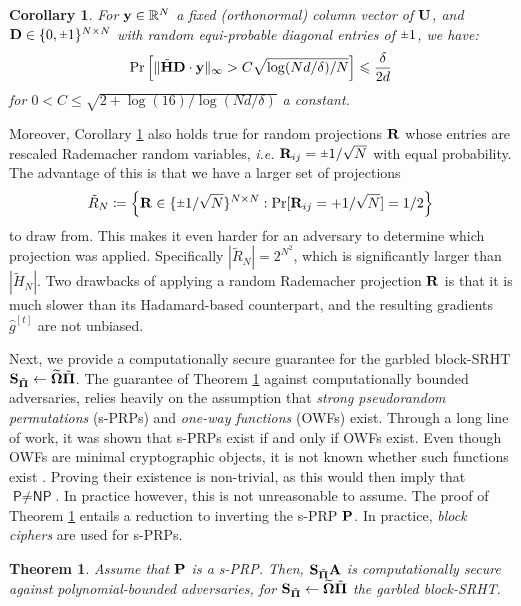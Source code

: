 \documentclass[journal,letterpaper,onecolumn,twoside,nofonttune]{IEEEtran}
\newcommand{\Rb}{\bold{R}}
\newcommand{\Rt}{\tilde{R}}
\newcommand{\Ub}{\bold{U}}
\newcommand{\yb}{\bold{y}}
\newcommand{\Pibold}{\bold{\Pi}}
\newcommand{\Pibt}{\tilde{\Pibold}}
\newcommand{\Omb}{\bold{\Omega}}
\newcommand{\Ombwt}{\widetilde{\Omb}}
\newcommand{\R}{\mathbb{R}}
\newcommand{\gh}{\hat{g}}
\newcommand{\Pb}{\bold{P}}
\newcommand{\Sb}{\bold{S}}
\newcommand{\SbPt}{\Sb_{\Pibt}}
\newcommand{\Ab}{\bold{A}}
\newcommand{\Db}{\bold{D}}
\newcommand{\Hbt}{\tilde{\bold{H}}}
\newcommand{\Ht}{\tilde{H}}
\newcommand{\rpm}{\raisebox{.2ex}{$\scriptstyle\pm$}}
\newtheorem{Thm}{Theorem}
\newtheorem{Cor}{Corollary}
\begin{document}
\begin{Cor}
\label{cor_fl_lem}
  For $\yb\in\R^N$ a fixed (orthonormal) column vector of $\Ub$, and $\Db\in\{0,\rpm1\}^{N\times N}$ with random equi-probable diagonal entries of $\rpm1$, we have:
  \begin{equation}
  \label{flat_lem_id_tilde}
    \Pr\left[\|\Hbt\Db\cdot\yb\|_\infty> C\sqrt{\log(Nd/\delta)/N}\right]\leqslant\frac{\delta}{2d}
  \end{equation}
  for $0<C\leqslant \sqrt{2+\log(16)/\log(Nd/\delta)}$ a constant.
\end{Cor}

Moreover, Corollary \ref{cor_fl_lem} also holds true for random projections $\Rb$ whose entries are rescaled Rademacher random variables, \textit{i.e.} $\Rb_{ij}=\rpm1/\sqrt{N}$ with equal probability. The advantage of this is that we have a larger set of projections
\begin{equation*}
  \Rt_N\coloneqq\Big\{\Rb\in\{\rpm1/\sqrt{N}\}^{N\times N}:\Pr[\Rb_{ij}=+1/\sqrt{N}]=1/2\Big\}
\end{equation*}
to draw from. This makes it even harder for an adversary to determine which projection was applied. Specifically $|\Rt_N|=2^{N^2}$, which is significantly larger than $|\Ht_N|$. Two drawbacks of applying a random Rademacher projection $\Rb$ is that it is much slower than its Hadamard-based counterpart, and the resulting gradients $\gh^{[t]}$ are not unbiased.

Next, we provide a computationally secure guarantee for the garbled block-SRHT $\SbPt\gets \Ombwt\Pibt$. The guarantee of Theorem \ref{SRHT_comp_sec_thm} against computationally bounded adversaries, relies heavily on the assumption that \textit{strong pseudorandom permutations} (s-PRPs) and \textit{one-way functions} (OWFs) exist. Through a long line of work, it was shown that s-PRPs exist if and only if OWFs exist. Even though OWFs are minimal cryptographic objects, it is not known whether such functions exist \cite{KL14}. Proving their existence is non-trivial, as this would then imply that $\textsf{P}\neq\textsf{NP}$. In practice however, this is not unreasonable to assume. The proof of Theorem \ref{SRHT_comp_sec_thm} entails a reduction to inverting the s-PRP $\Pb$. In practice, \textit{block ciphers} are used for s-PRPs.

\begin{Thm}
\label{SRHT_comp_sec_thm}
Assume that $\Pb$ is a s-PRP. Then, $\SbPt\Ab$ is computationally secure against polynomial-bounded adversaries, for $\SbPt\gets \Ombwt\Pibt$ the garbled block-SRHT.
\end{Thm}
\end{document}

